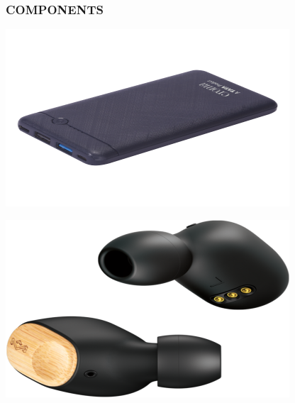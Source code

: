 \documentclass[
	11pt, %
	t, %
	aspectratio=169, %
]{beamer}
\begin{document}
\begin{frame}
	\frametitle{COMPONENTS}
	
	\begin{center}	
		\begin{minipage}{0.30\textwidth}
			\includegraphics[width=\textwidth]{chromo.png}
		\end{minipage}\hspace{1cm}
		\begin{minipage}{0.30\textwidth}
			\includegraphics[width=\textwidth]{ear.png}
		\end{minipage}
	\end{center}
\end{frame}

\end{document}
